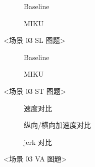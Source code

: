 \begin{figure}[H]
\centering
\begin{subfigure}[b]{\textwidth}
  \centering
  
  \caption{Baseline}
  \label{fig:exp_03_narrow_cones_sl:a}
\end{subfigure}

\begin{subfigure}[b]{\textwidth}
  \centering
  
  \caption{MIKU}
  \label{fig:exp_03_narrow_cones_sl:b}
\end{subfigure}
\caption{<场景 03 SL 图题>}
\label{fig:exp_03_narrow_cones_sl}
\end{figure}

\begin{figure}[H]
\centering
\begin{subfigure}[b]{0.48\textwidth}
  \centering
  
  \caption{Baseline}
  \label{fig:exp_03_narrow_cones_st:a}
\end{subfigure}\hfill
\begin{subfigure}[b]{0.48\textwidth}
  \centering
  
  \caption{MIKU}
  \label{fig:exp_03_narrow_cones_st:b}
\end{subfigure}
\caption{<场景 03 ST 图题>}
\label{fig:exp_03_narrow_cones_st}
\end{figure}

\begin{figure}[H]
\centering
\begin{subfigure}[b]{\textwidth}
  \centering
  
  \caption{速度对比}
  \label{fig:exp_03_narrow_cones_va:a}
\end{subfigure}

\begin{subfigure}[b]{\textwidth}
  \centering
  
  \caption{纵向/横向加速度对比}
  \label{fig:exp_03_narrow_cones_va:b}
\end{subfigure}

\begin{subfigure}[b]{\textwidth}
  \centering
  
  \caption{jerk 对比}
  \label{fig:exp_03_narrow_cones_va:c}
\end{subfigure}
\caption{<场景 03 VA 图题>}
\label{fig:exp_03_narrow_cones_va}
\end{figure}

